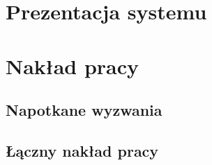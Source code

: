 \chapter{Prezentacja systemu}
\label{ch:prezentacja-systemu}



\chapter{Nakład pracy}
\label{ch:naklad-pracy}

\section{Napotkane wyzwania }
\label{sec:napotkane-wyzwania}


\section{Łączny nakład pracy}
\label{sec:laczny-naklad-pracy}




